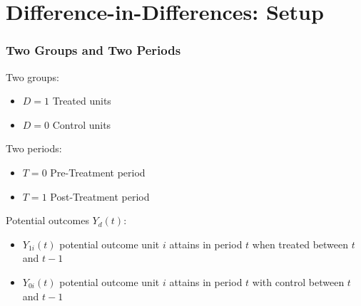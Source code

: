\documentclass{beamer}
\numberwithin{equation}{section}
\begin{document}
%

\section{Difference-in-Differences: Setup}


\begin{frame}
  \frametitle{Two Groups and Two Periods}
\begin{Definition}
Two groups:
\begin{itemize}
\item $D=1$ Treated units
\item $D=0$ Control units
\end{itemize}\medskip
Two periods:
\begin{itemize}
\item $T=0$ Pre-Treatment period
\item $T=1$ Post-Treatment period
\end{itemize}\medskip
Potential outcomes $Y_d(t)$:
\begin{itemize}
\item $Y_{1i}(t)$ potential outcome unit $i$ attains in period $t$ when treated between $t$ and $t-1$
\item $Y_{0i}(t)$ potential outcome unit $i$ attains in period $t$ with control between $t$ and $t-1$
\end{itemize}
\end{Definition}
\end{frame}
\end{document}
